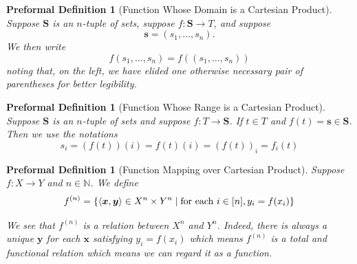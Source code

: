 \documentclass[oneside, 12pt]{book}
\theoremstyle{break}
\newtheorem{preformal definition}[definition]{Preformal Definition}
\newtheorem{preformal theorem}[theorem]{Preformal Theorem}
\newcommand{\bv}[1]{\boldsymbol{#1}}
\begin{document}
			\begin{preformal definition}[Function Whose Domain is a Cartesian Product]
				Suppose $\bv{S}$ is an $n$-tuple of sets, suppose $f: \bv{S} \to T$, and suppose 
				\begin{equation*}
					\bv{s} = (s_1, \ldots, s_n).
				\end{equation*}
				We then write
				\begin{equation*}
					f(s_1, \ldots, s_n) = f((s_1, \ldots, s_n))
				\end{equation*}
				noting that, on the left, we have elided one otherwise necessary pair of parentheses for better legibility.
			\end{preformal definition}
			
			\begin{preformal definition}[Function Whose Range is a Cartesian Product]
				Suppose $\bv{S}$ is an $n$-tuple of sets and suppose $f:T \to \bv{S}$.
				If $t\in T$ and $f(t) = \bv{s} \in \bv{S}$.
				Then we use the notations
				\begin{equation*}
					s_i = (f(t))(i) = f(t)(i) = (f(t))_i = f_i(t)
				\end{equation*}
			\end{preformal definition}
			
			\begin{preformal definition}[Function Mapping over Cartesian Product]
				Suppose $f:X \to Y$ and $n\in \mathbb{N}$.
				We define
				\begin{align}
					f^{(n)} = \{\braket{\bv{x}, \bv{y}} \in X^n \times Y^n \mid \text{for each } i \in [n], y_i = f(x_i)\}
				\end{align}
				
				We see that $f^{(n)}$ is a relation between $X^n$ and $Y^n$.
				Indeed, there is always a unique $\bv{y}$ for each $\bv{x}$ satisfying $y_i = f(x_i)$ which means $f^{(n)}$ is a total and functional relation which means we can regard it as a function.
			\end{preformal definition}			
			
\end{document}
